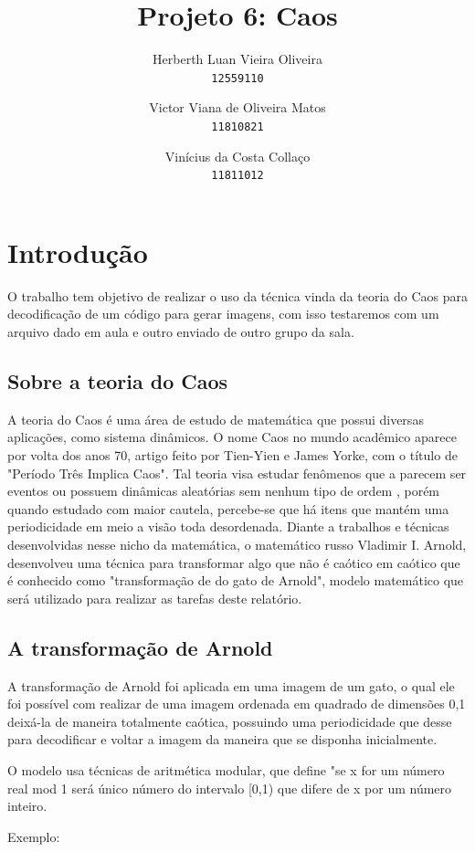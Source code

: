 \documentclass[a4paper, 12pt]{article}
\title{Projeto 6: Caos}
\author{
  Herberth Luan Vieira Oliveira\\
  \texttt{12559110}
  \and
  Victor Viana de Oliveira Matos\\
  \texttt{11810821}
  \and
  Vinícius da Costa Collaço\\
  \texttt{11811012}
}
\begin{document}
\maketitle

\section{Introdução}

O trabalho tem objetivo de realizar o uso da técnica vinda da teoria do Caos para decodificação de um código para gerar imagens, com isso testaremos com um arquivo dado em aula e outro enviado de outro grupo da sala. 

\subsection{Sobre a teoria do Caos}
A teoria do Caos é uma área de estudo de matemática que possui diversas aplicações, como sistema dinâmicos. 
O nome Caos no mundo acadêmico aparece por volta dos anos 70, artigo feito por Tien-Yien e James Yorke, com o título de "Período Três Implica Caos".
Tal teoria visa estudar fenômenos que a parecem ser eventos ou possuem dinâmicas aleatórias sem nenhum tipo de ordem , porém quando estudado com maior cautela, percebe-se que há itens que mantém uma periodicidade em meio a visão toda desordenada.
Diante a trabalhos e técnicas desenvolvidas nesse nicho da matemática, o matemático russo Vladimir I. Arnold, desenvolveu uma técnica para transformar algo que não é caótico em caótico que é conhecido como "transformação de do gato de Arnold", modelo matemático que será utilizado para realizar as tarefas deste relatório.

\subsection{A transformação de Arnold}

A transformação de Arnold foi aplicada em uma imagem de um gato, o qual ele foi possível com realizar de uma imagem ordenada em quadrado de dimensões 0,1 deixá-la de maneira totalmente caótica, possuindo uma periodicidade que desse para decodificar e voltar a imagem da maneira que se disponha inicialmente.

O modelo usa técnicas de aritmética modular, que define "se x for um número real mod 1 será único número do intervalo [0,1) que difere de x por um número inteiro. 

  Exemplo: 
\end{document}
